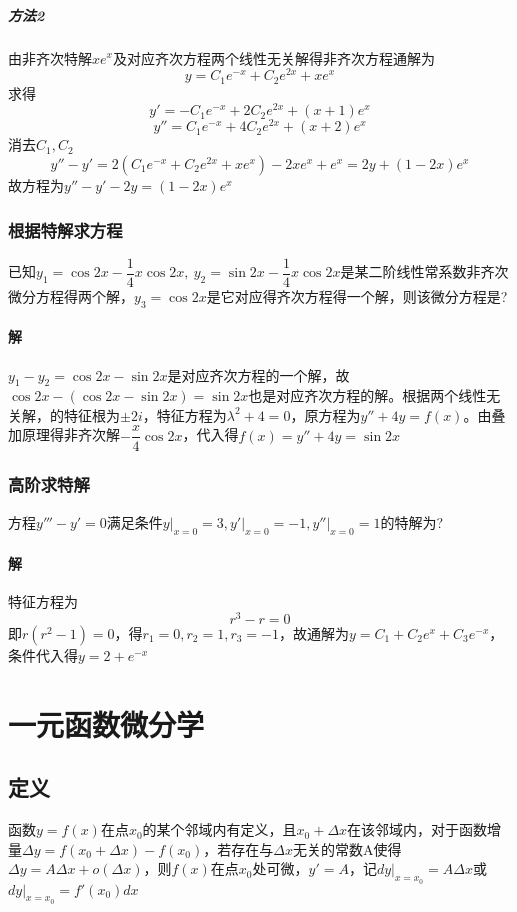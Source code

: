 \subparagraph{方法2}
由非齐次特解\(xe^x\)及对应齐次方程两个线性无关解得非齐次方程通解为\[y = C_1e^{-x} + C_2e^{2x} + xe^x\]
求得\[y' = -C_1e^{-x} + 2C_2e^{2x} + (x + 1)e^x\]
\[y'' = C_1e^{-x} + 4C_2e^{2x} + (x + 2)e^x\]
消去\(C_1, C_2\)\[y'' - y' = 2(C_1e^{-x} + C_2e^{2x} + xe^x) - 2xe^x + e^x = 2y + (1 - 2x)e^x\]
故方程为\(y'' - y' - 2y = (1 - 2x)e^x\)


\subsubsection{根据特解求方程}
已知\(y_1 = \cos2x - \dfrac{1}{4}x\cos2x,\ y_2 = \sin2x - \dfrac{1}{4}x\cos2x\)是某二阶线性常系数非齐次微分方程得两个解，\(y_3 = \cos2x\)是它对应得齐次方程得一个解，则该微分方程是?

\paragraph{解}
\(y_1 - y_2 = \cos2x - \sin2x\)是对应齐次方程的一个解，故\(\cos2x - (\cos2x - \sin2x) = \sin2x\)也是对应齐次方程的解。根据两个线性无关解，的特征根为\(\pm2i\)，特征方程为\(\lambda^2 + 4 = 0\)，原方程为\(y'' + 4y = f(x)\)。由叠加原理得非齐次解\(-\dfrac{x}{4}\cos2x\)，代入得\(f(x) = y'' + 4y = \sin2x\)


\subsubsection{高阶求特解}
方程\(y''' - y' = 0\)满足条件\(y\bigg|_{x = 0} = 3, y'\bigg|_{x = 0} = -1, y''\bigg|_{x = 0} = 1\)的特解为?
\paragraph{解}
特征方程为\[r^3 - r = 0\]即\(r(r^2 - 1) = 0\)，得\(r_1 = 0, r_2 = 1, r_3 = -1\)，故通解为\(y = C_1 + C_2e^x + C_3e^{-x}\)，条件代入得\(y = 2 + e^{-x}\)


\section{一元函数微分学}

\subsection{定义}

函数\(y = f(x)\)在点\(x_0\)的某个邻域内有定义，且\(x_0 + \Delta x\)在该邻域内，对于函数增量\(\Delta y = f(x_0 + \Delta x) - f(x_0)\)，若存在与\(\Delta x\)无关的常数A使得\(\Delta y = A\Delta x + o(\Delta x)\)，则\(f(x)\)在点\(x_0\)处可微，\(y' = A\)，记\(dy|_{x = x_0} = A\Delta x\)或\(dy|_{x = x_0} = f'(x_0)dx\)

